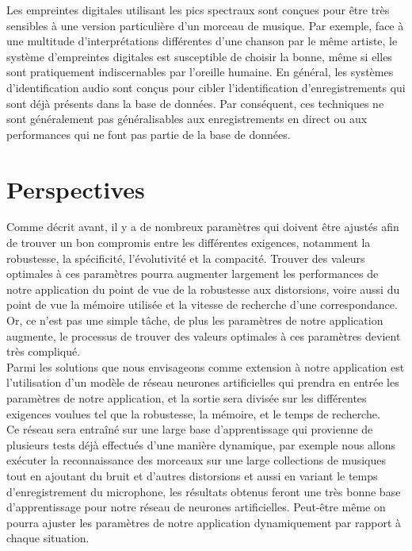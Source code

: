 \documentclass[10pt, english]{report}
\begin{document}
Les empreintes digitales utilisant les pics spectraux sont conçues pour être très sensibles à une version particulière d'un morceau de musique. Par exemple, face à une multitude d'interprétations différentes d'une chanson par le même artiste, le système d'empreintes digitales est susceptible de choisir la bonne, même si elles sont pratiquement indiscernables par l'oreille humaine. En général, les systèmes d'identification audio sont conçus pour cibler l'identification d'enregistrements qui sont déjà présents dans la base de données. Par conséquent, ces techniques ne sont généralement pas généralisables aux enregistrements en direct ou aux performances qui ne font pas partie de la base de données.


\chapter{Perspectives}
Comme décrit avant, il y a de nombreux paramètres qui doivent être ajustés afin de trouver un bon compromis entre les différentes exigences, notamment la robustesse, la spécificité, l'évolutivité et la compacité. Trouver des valeurs optimales à ces paramètres pourra augmenter largement les performances de notre application du point de vue de la robustesse aux distorsions, voire aussi du point de vue la mémoire utilisée et la vitesse de recherche d'une correspondance. Or, ce n'est pas une simple tâche, de plus les paramètres de notre application augmente, le processus de trouver des valeurs optimales à ces paramètres devient très compliqué.\\

Parmi les solutions que nous envisageons comme extension à notre application est l'utilisation d'un modèle de réseau neurones artificielles qui prendra en entrée les paramètres de notre application, et la sortie sera divisée sur les différentes exigences voulues tel que la robustesse, la mémoire, et le temps de recherche.\\

Ce réseau sera entraîné sur une large base d'apprentissage qui provienne de plusieurs tests déjà effectués d'une manière dynamique, par exemple nous allons exécuter la reconnaissance des morceaux sur une large collections de musiques tout en ajoutant du bruit et d'autres distorsions et aussi en variant le temps d'enregistrement du microphone, les résultats obtenus feront une très bonne base d'apprentissage pour notre réseau de neurones artificielles. Peut-être même on pourra ajuster les paramètres de notre application dynamiquement par rapport à chaque situation.\\
\end{document}
